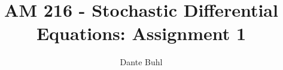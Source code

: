 \documentclass{article}
\begin{document}
\title{AM 216 - Stochastic Differential Equations: Assignment 1}
\author{Dante Buhl}


\newcommand{\wrms}{w_{\text{rms}}}
\newcommand{\bs}[1]{\boldsymbol{#1}}
\newcommand{\tb}[1]{\textbf{#1}}
\newcommand{\bmp}[1]{\begin{minipage}{#1\textwidth}}
\newcommand{\emp}{\end{minipage}}
\newcommand{\R}{\mathbb{R}}
\newcommand{\C}{\mathbb{C}}
\newcommand{\N}{\mathcal{N}}
\newcommand{\Var}{\text{Var}}
\newcommand{\Bino}{\text{Bino}}
\newcommand{\Norm}{\mathcal{N}}
\newcommand{\erf}{\text{erf}}
\newcommand{\m}{\bs{\mu}_*}
\newcommand{\s}{\bs{\Sigma}_*}
\newcommand{\dt}{\Delta t}
\newcommand{\dx}{\Delta x}
\newcommand{\tr}[1]{\text{Tr}(#1)}
\newcommand{\Tr}[1]{\text{Tr}(#1)}
\newcommand{\Div}{\nabla \cdot}
\renewcommand{\div}{\nabla \cdot}
\newcommand{\Curl}{\nabla \times}
\newcommand{\Grad}{\nabla}
\newcommand{\grad}{\nabla}
\newcommand{\grads}{\nabla_s}
\newcommand{\gradf}{\nabla_f}
\newcommand{\xs}{x_s}
\newcommand{\x}{\bs{x}}
\newcommand{\xf}{x_f}
\newcommand{\ts}{t_s}
\newcommand{\tf}{t_f}
\newcommand{\pt}{\partial t}
\newcommand{\pz}{\partial z}
\newcommand{\uvec}{\bs{u}}
\newcommand{\bvec}{\bs{B}}
\newcommand{\nvec}{\hat{\bs{n}}}
\newcommand{\tu}{\tilde{\uvec}}
\newcommand{\B}{\bs{B}}
\newcommand{\A}{\bs{A}}
\newcommand{\jvec}{\bs{j}}
\newcommand{\F}{\bs{F}}
\newcommand{\T}{\tilde{T}}
\newcommand{\ez}{\bs{e}_z}
\newcommand{\ex}{\bs{e}_x}
\newcommand{\ey}{\bs{e}_y}
\newcommand{\eo}{\bs{e}_{\bs{\Omega}}}
\newcommand{\ppt}[1]{\frac{\partial #1}{\partial t}}
\newcommand{\pp}[2]{\frac{\partial #1}{\partial #2}}
\newcommand{\pptwo}[2]{\frac{\partial^2 #1}{\partial #2^2}}
\newcommand{\ddtwo}[2]{\frac{d^2 #1}{d #2^2}}
\newcommand{\DDt}[1]{\frac{D #1}{D t}}
\newcommand{\ppts}[1]{\frac{\partial #1}{\partial t_s}}
\newcommand{\pptf}[1]{\frac{\partial #1}{\partial t_f}}
\newcommand{\ppz}[1]{\frac{\partial #1}{\partial z}}
\newcommand{\ddz}[1]{\frac{d #1}{d z}}
\newcommand{\ppzetas}[1]{\frac{\partial^2 #1}{\partial \zeta^2}}
\newcommand{\ppzs}[1]{\frac{\partial #1}{\partial z_s}}
\newcommand{\ppzf}[1]{\frac{\partial #1}{\partial z_f}}
\newcommand{\ppx}[1]{\frac{\partial #1}{\partial x}}
\newcommand{\ddx}[1]{\frac{d #1}{d x}}
\newcommand{\ppxi}[1]{\frac{\partial #1}{\partial x_i}}
\newcommand{\ppxj}[1]{\frac{\partial #1}{\partial x_j}}
\newcommand{\ppy}[1]{\frac{\partial #1}{\partial y}}
\newcommand{\ppzeta}[1]{\frac{\partial #1}{\partial \zeta}}
\renewcommand{\k}{\bs{k}}
\newcommand{\real}[1]{\text{Re}\left[#1\right]}
\end{document}
